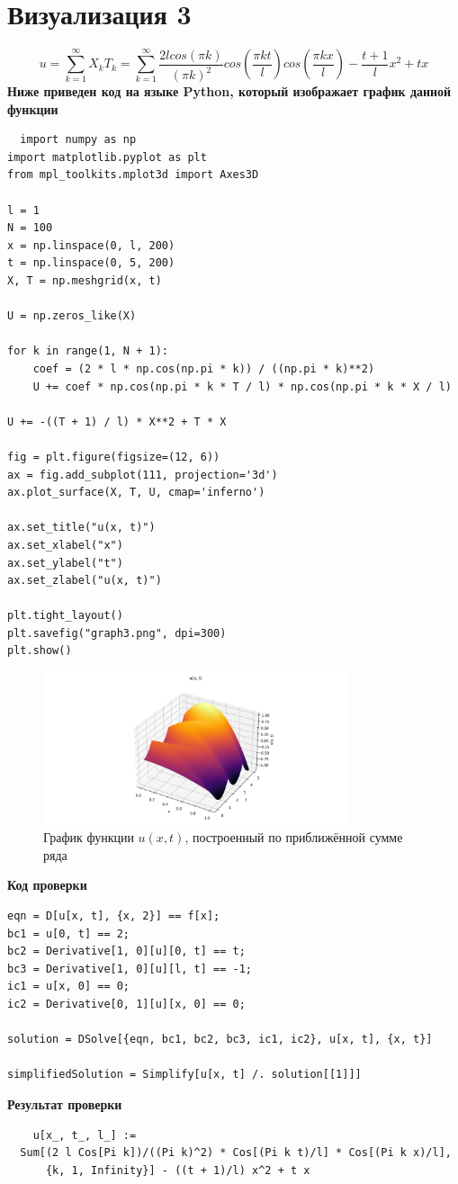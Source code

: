 \documentclass[a4paper,12pt]{article}
\begin{document}
\section*{Визуализация 3}
$$u = \sum_{k=1}^{\infty}X_k T_k = \sum_{k=1}^{\infty} \frac{2l cos(\pi k)}{(\pi k)^2}cos(\frac{\pi k t}{l})cos(\frac{\pi k x}{l}) - \frac{t+1}{l}x^2 + tx$$
\textbf{Ниже приведен код на языке Python, который изображает график данной функции}
\begin{lstlisting}
  import numpy as np
import matplotlib.pyplot as plt
from mpl_toolkits.mplot3d import Axes3D

l = 1
N = 100 
x = np.linspace(0, l, 200)
t = np.linspace(0, 5, 200)
X, T = np.meshgrid(x, t)

U = np.zeros_like(X)

for k in range(1, N + 1):
    coef = (2 * l * np.cos(np.pi * k)) / ((np.pi * k)**2)
    U += coef * np.cos(np.pi * k * T / l) * np.cos(np.pi * k * X / l)

U += -((T + 1) / l) * X**2 + T * X

fig = plt.figure(figsize=(12, 6))
ax = fig.add_subplot(111, projection='3d')
ax.plot_surface(X, T, U, cmap='inferno')

ax.set_title("u(x, t)")
ax.set_xlabel("x")
ax.set_ylabel("t")
ax.set_zlabel("u(x, t)")

plt.tight_layout()
plt.savefig("graph3.png", dpi=300)
plt.show()

\end{lstlisting}
\begin{figure}[H]
    \centering
    \includegraphics[width=0.8\textwidth]{../../graph3.png}
    \caption{График функции $u(x,t)$, построенный по приближённой сумме ряда}
\end{figure}

\textbf{Код проверки}
\begin{lstlisting}
eqn = D[u[x, t], {x, 2}] == f[x];
bc1 = u[0, t] == 2;
bc2 = Derivative[1, 0][u][0, t] == t;
bc3 = Derivative[1, 0][u][l, t] == -1;
ic1 = u[x, 0] == 0;
ic2 = Derivative[0, 1][u][x, 0] == 0;

solution = DSolve[{eqn, bc1, bc2, bc3, ic1, ic2}, u[x, t], {x, t}]

simplifiedSolution = Simplify[u[x, t] /. solution[[1]]]
\end{lstlisting}
\textbf{Результат проверки}
\begin{lstlisting}
    u[x_, t_, l_] := 
  Sum[(2 l Cos[Pi k])/((Pi k)^2) * Cos[(Pi k t)/l] * Cos[(Pi k x)/l], 
      {k, 1, Infinity}] - ((t + 1)/l) x^2 + t x
\end{lstlisting}
\end{document}
